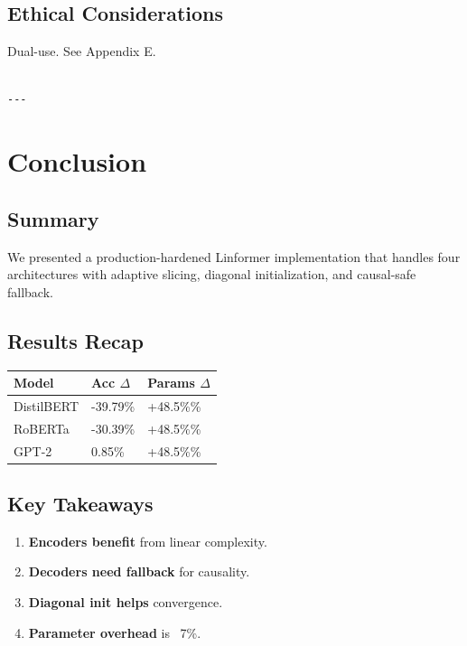\subsection{Ethical Considerations}

Dual-use. See Appendix E.
\begin{lstlisting}

---
\end{lstlisting}

\section{Conclusion}

\subsection{Summary}

We presented a production-hardened Linformer implementation that handles 
four architectures with adaptive slicing, diagonal initialization, and 
causal-safe fallback.

\subsection{Results Recap}

\begin{table}[H]
\centering
\small
\begin{tabular}{lll}
\toprule
\textbf{Model} & \textbf{Acc $\Delta$} & \textbf{Params $\Delta$} \\
\midrule
DistilBERT & -39.79\% & +48.5\%\% \\
RoBERTa & -30.39\% & +48.5\%\% \\
GPT-2 & 0.85\% & +48.5\%\% \\
\bottomrule
\end{tabular}
\end{table}

\subsection{Key Takeaways}

\begin{enumerate}
\item \textbf{Encoders benefit} from linear complexity.
\item \textbf{Decoders need fallback} for causality.
\item \textbf{Diagonal init helps} convergence.
\item \textbf{Parameter overhead} is ~7\%.

\end{enumerate}
